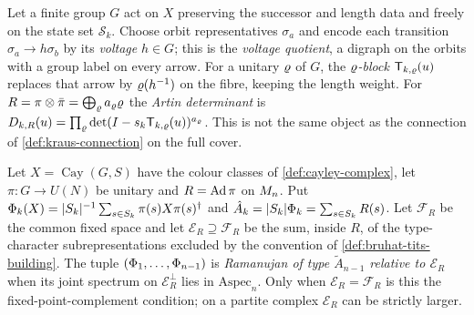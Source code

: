 \begin{definition}
\label{def:voltage-quotient}
Let a finite group $G$ act on $X$ preserving the successor and length data and
freely on the state set $\mathcal S_k$. Choose orbit representatives $\sigma_a$ %
and encode each transition $\sigma_a\to h\sigma_b$ by its \emph{voltage} %
$h\in G$; this is the \emph{voltage quotient}, a digraph on the orbits with a
group label on every arrow. For a unitary $\varrho$ of $G$, the
\emph{$\varrho$-block} $\mathsf T_{k,\varrho}(u)$ replaces that arrow by
$\varrho(h^{-1})$ on the fibre, keeping the length weight. For
$R = \pi\otimes\bar\pi = \bigoplus_\varrho a_\varrho\varrho$ the \emph{Artin
determinant} is $D_{k,R}(u) = \prod_\varrho
\det(I-s_k\mathsf T_{k,\varrho}(u))^{a_\varrho}$. This is not the same object
as the connection of \cref{def:kraus-connection} on the full cover.
\end{definition}

\begin{definition}
\label{def:ramanujan-quantum-expander-a2}
Let $X = \operatorname{Cay}(G,S)$ have the colour classes of
\cref{def:cayley-complex}, let $\pi\colon G\to U(N)$ be unitary and
$R = \operatorname{Ad}\pi$ on $M_n$. Put
$\Phi_k(X) = |S_k|^{-1}\sum_{s\in S_k}\pi(s)X\pi(s)^\dagger$ and
$\hat A_k = |S_k|\Phi_k = \sum_{s\in S_k}R(s)$. Let $\mathcal F_R$ be the
common fixed space and let $\mathcal E_R\supseteq\mathcal F_R$ be the sum,
inside $R$, of the type-character subrepresentations excluded by the convention
of \cref{def:bruhat-tits-building}. The tuple $(\Phi_1,\dots,\Phi_{n-1})$ is
\emph{Ramanujan of type $\tilde A_{n-1}$ relative to $\mathcal E_R$} when its
joint spectrum on $\mathcal E_R^{\perp}$ lies in $\mathrm{Aspec}_n$. Only when
$\mathcal E_R = \mathcal F_R$ is this the fixed-point-complement condition; on a
partite complex $\mathcal E_R$ can be strictly larger.
\end{definition}
